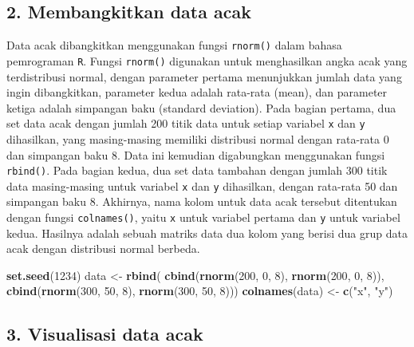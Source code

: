 \documentclass[
  oneside]{book}
\newenvironment{Shaded}{\begin{snugshade}}{\end{snugshade}}
\newcommand{\DecValTok}[1]{\textcolor[rgb]{0.00,0.00,0.81}{#1}}
\newcommand{\FunctionTok}[1]{\textcolor[rgb]{0.13,0.29,0.53}{\textbf{#1}}}
\newcommand{\NormalTok}[1]{#1}
\newcommand{\OtherTok}[1]{\textcolor[rgb]{0.56,0.35,0.01}{#1}}
\newcommand{\StringTok}[1]{\textcolor[rgb]{0.31,0.60,0.02}{#1}}
\begin{document}
\subsection*{2. Membangkitkan data acak}\label{membangkitkan-data-acak}

Data acak dibangkitkan menggunakan fungsi \texttt{rnorm()} dalam bahasa pemrograman \texttt{R}. Fungsi \texttt{rnorm()} digunakan untuk menghasilkan angka acak yang terdistribusi normal, dengan parameter pertama menunjukkan jumlah data yang ingin dibangkitkan, parameter kedua adalah rata-rata (mean), dan parameter ketiga adalah simpangan baku (standard deviation). Pada bagian pertama, dua set data acak dengan jumlah 200 titik data untuk setiap variabel \texttt{x} dan \texttt{y} dihasilkan, yang masing-masing memiliki distribusi normal dengan rata-rata 0 dan simpangan baku 8. Data ini kemudian digabungkan menggunakan fungsi \texttt{rbind()}. Pada bagian kedua, dua set data tambahan dengan jumlah 300 titik data masing-masing untuk variabel \texttt{x} dan \texttt{y} dihasilkan, dengan rata-rata 50 dan simpangan baku 8. Akhirnya, nama kolom untuk data acak tersebut ditentukan dengan fungsi \texttt{colnames()}, yaitu \texttt{x} untuk variabel pertama dan \texttt{y} untuk variabel kedua. Hasilnya adalah sebuah matriks data dua kolom yang berisi dua grup data acak dengan distribusi normal berbeda.

\begin{Shaded}
\begin{Highlighting}[]
\FunctionTok{set.seed}\NormalTok{(}\DecValTok{1234}\NormalTok{)}
\NormalTok{data }\OtherTok{\textless{}{-}} \FunctionTok{rbind}\NormalTok{(}
  \FunctionTok{cbind}\NormalTok{(}\FunctionTok{rnorm}\NormalTok{(}\DecValTok{200}\NormalTok{, }\DecValTok{0}\NormalTok{, }\DecValTok{8}\NormalTok{), }\FunctionTok{rnorm}\NormalTok{(}\DecValTok{200}\NormalTok{, }\DecValTok{0}\NormalTok{, }\DecValTok{8}\NormalTok{)),}
  \FunctionTok{cbind}\NormalTok{(}\FunctionTok{rnorm}\NormalTok{(}\DecValTok{300}\NormalTok{, }\DecValTok{50}\NormalTok{, }\DecValTok{8}\NormalTok{), }\FunctionTok{rnorm}\NormalTok{(}\DecValTok{300}\NormalTok{, }\DecValTok{50}\NormalTok{, }\DecValTok{8}\NormalTok{)))}
\FunctionTok{colnames}\NormalTok{(data) }\OtherTok{\textless{}{-}} \FunctionTok{c}\NormalTok{(}\StringTok{"x"}\NormalTok{, }\StringTok{"y"}\NormalTok{)}
\end{Highlighting}
\end{Shaded}

\subsection*{3. Visualisasi data acak}\label{visualisasi-data-acak}
\end{document}
